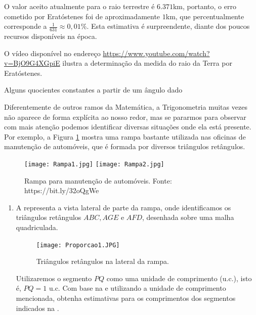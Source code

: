  O valor aceito atualmente para o raio terrestre é $6.371$km, portanto, o erro cometido por Eratóstenes foi de aproximadamente $1$km, que percentualmente corresponde a $\frac{1}{631} \approx 0,01\%$. Esta estimativa é surpreendente, diante dos poucos recursos disponíveis na época. 
 
 O vídeo disponível no endereço \url{https://www.youtube.com/watch?v=BjO9G4XGpiE} ilustra a determinação da medida do raio da Terra por Eratóstenes.

\newpage
\begin{task}{Alguns quocientes constantes a partir de um ângulo dado}

Diferentemente de outros ramos da Matemática, a Trigonometria muitas vezes não aparece de forma explícita ao nosso redor, mas se pararmos para observar com mais atenção podemos identificar diversas situações onde ela está presente. Por exemplo, a  Figura \ref{Rampas} mostra uma rampa bastante utilizada nas oficinas de manutenção de automóveis, que é formada por diversos triângulos retângulos.
\begin{figure}[H]
    \centering
    \texttt{[image: Rampa1.jpg]}
    \texttt{[image: Rampa2.jpg]}
    \caption{Rampa para manutenção de automóveis. Fonte: https://bit.ly/32oQgWe}
    \label{Rampas}
\end{figure}

\begin{enumerate}
    \item{}
    A   representa a vista lateral de parte da rampa, onde identificamos os triângulos retângulos $ABC, AGE$ e $AFD$, desenhada sobre uma malha quadriculada.
    \begin{figure}[H]
    \centering
    \texttt{[image: Proporcao1.JPG]}
    \caption{Triângulos retângulos na lateral da rampa.}
    \label{Proporcao1}
\end{figure}

Utilizaremos o segmento $PQ$ como uma unidade de comprimento (u.c.), isto é, $PQ=1$ u.c. Com base na   e utilizando a unidade de comprimento mencionada, obtenha estimativas para os comprimentos dos segmentos indicados na  .


\end{enumerate}
\end{task}
